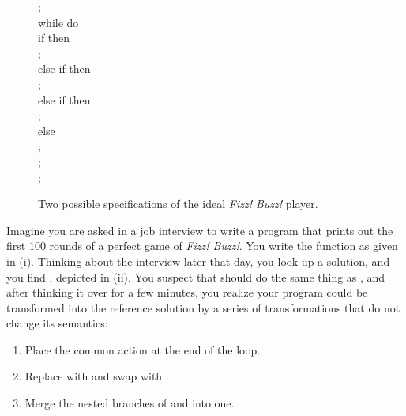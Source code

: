 \documentclass[orivec,envcountsect,envcountsame]{llncs}
\begin{document}
\begin{figure}[t]
\begin{center}
{{                \hspace*{1em}; \\
                \hspace*{1em}while  do \\
                \hspace*{2em}if  then \\
                \hspace*{3em}; \\
                \hspace*{2em}else if  then \\
                \hspace*{3em}; \\
                \hspace*{2em}else if  then \\
                \hspace*{3em}; \\
                \hspace*{2em}else \\
                \hspace*{3em}; \\
                \hspace*{2em}; \\
                \hspace*{1em};
            }}
        \end{center}
        \caption{\label{fig:example}
            Two possible specifications of the ideal \emph{Fizz! Buzz!} player.
        }
    \end{figure}

    Imagine you are asked in a job interview to write a program that prints out the first \(100\) rounds of a perfect game of \emph{Fizz! Buzz!}.
    You write the function  as given in (i). %
    Thinking about the interview later that day, you look up a solution, and you find , depicted in (ii). %
    You suspect that  should do the same thing as , and after thinking it over for a few minutes, you realize your program could be transformed into the reference solution by a series of transformations that do not change its semantics:
    \begin{enumerate}
        \item
        Place the common action  at the end of the loop.
        \item
        Replace  with  and swap  with .
        \item
        Merge the nested branches of  and  into one.
    \end{enumerate}
\end{document}
